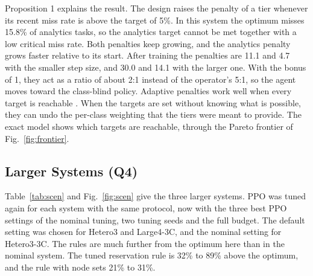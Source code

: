 \documentclass[journal]{IEEEtran}
\begin{document}
Proposition 1 explains the result. The design raises the penalty of a tier whenever its recent miss rate is above the target of 5\%. In this system the optimum misses 15.8\% of analytics tasks, so the analytics target cannot be met together with a low critical miss rate. Both penalties keep growing, and the analytics penalty grows faster relative to its start. After training the penalties are 11.1 and 4.7 with the smaller step size, and 30.0 and 14.1 with the larger one. With the bonus of 1, they act as a ratio of about 2:1 instead of the operator's 5:1, so the agent moves toward the class-blind policy. Adaptive penalties work well when every target is reachable \cite{altman1999,tessler2019}. When the targets are set without knowing what is possible, they can undo the per-class weighting that the tiers were meant to provide. The exact model shows which targets are reachable, through the Pareto frontier of Fig.~\ref{fig:frontier}.

\subsection{Larger Systems (Q4)}
Table~\ref{tab:scen} and Fig.~\ref{fig:scen} give the three larger systems. PPO was tuned again for each system with the same protocol, now with the three best PPO settings of the nominal tuning, two tuning seeds and the full budget. The default setting was chosen for Hetero3 and Large4-3C, and the nominal setting for Hetero3-3C. The rules are much further from the optimum here than in the nominal system. The tuned reservation rule is 32\% to 89\% above the optimum, and the rule with node sets 21\% to 31\%.
\end{document}
